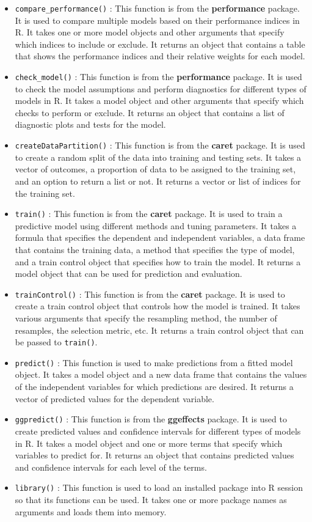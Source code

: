 \documentclass[
]{book}
\begin{document}
\begin{itemize}
\item
  \texttt{compare\_performance()} : This function is from the \textbf{performance} package. It is used to compare multiple models based on their performance indices in R. It takes one or more model objects and other arguments that specify which indices to include or exclude. It returns an object that contains a table that shows the performance indices and their relative weights for each model.
\item
  \texttt{check\_model()} : This function is from the \textbf{performance} package. It is used to check the model assumptions and perform diagnostics for different types of models in R. It takes a model object and other arguments that specify which checks to perform or exclude. It returns an object that contains a list of diagnostic plots and tests for the model.
\item
  \texttt{createDataPartition()} : This function is from the \textbf{caret} package. It is used to create a random split of the data into training and testing sets. It takes a vector of outcomes, a proportion of data to be assigned to the training set, and an option to return a list or not. It returns a vector or list of indices for the training set.
\item
  \texttt{train()} : This function is from the \textbf{caret} package. It is used to train a predictive model using different methods and tuning parameters. It takes a formula that specifies the dependent and independent variables, a data frame that contains the training data, a method that specifies the type of model, and a train control object that specifies how to train the model. It returns a model object that can be used for prediction and evaluation.
\item
  \texttt{trainControl()} : This function is from the \textbf{caret} package. It is used to create a train control object that controls how the model is trained. It takes various arguments that specify the resampling method, the number of resamples, the selection metric, etc. It returns a train control object that can be passed to \texttt{train()}.
\item
  \texttt{predict()} : This function is used to make predictions from a fitted model object. It takes a model object and a new data frame that contains the values of the independent variables for which predictions are desired. It returns a vector of predicted values for the dependent variable.
\item
  \texttt{ggpredict()} : This function is from the \textbf{ggeffects} package. It is used to create predicted values and confidence intervals for different types of models in R. It takes a model object and one or more terms that specify which variables to predict for. It returns an object that contains predicted values and confidence intervals for each level of the terms.
\item
  \texttt{library()} : This function is used to load an installed package into R session so that its functions can be used. It takes one or more package names as arguments and loads them into memory.
\end{itemize}
\end{document}

